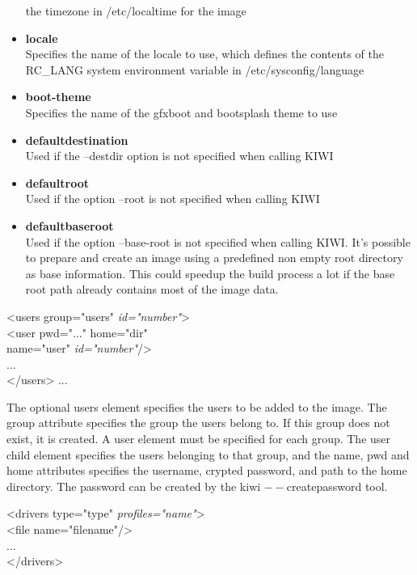 \begin{itemize}
      the timezone in /etc/localtime for the image
\item \textbf{locale}\\
      Specifies the name of the locale to use, which defines the
      contents of the RC\_LANG system environment variable in
      /etc/sysconfig/language
\item \textbf{boot-theme}\\
      Specifies the name of the gfxboot and bootsplash theme to use
\item \textbf{defaultdestination}\\
      Used if the --destdir option is not specified when calling KIWI
\item \textbf{defaultroot}\\
      Used if the option --root is not specified when calling KIWI
\item \textbf{defaultbaseroot}\\
      Used if the option --base-root is not specified when
      calling KIWI. It's possible to prepare and create an image using a
      predefined non empty root directory as base information.
      This could speedup the build process a lot if the base root path
      already contains most of the image data.
\end{itemize}

\begin{Command}{12cm}
<users group="users" \textit{id="number"}>\\
\hspace*{1cm}<user pwd="..." home="dir"\\ 
\hspace*{1.5cm}name="user" \textit{id="number"}/>\\
\hspace*{1cm}...\\
</users>
...
\end{Command}

The optional users element specifies the users to be added to the image.
The group attribute specifies the group the users belong to. If this group
does not exist, it is created. A user element must be specified for
each group. The user child element specifies the users belonging to that
group, and the name, pwd and home attributes specifies the username,
crypted password, and path to the home directory. The password can be
created by the kiwi $--$createpassword tool.

\begin{Command}{12cm}
<drivers type="type" \textit{profiles="name"}>\\
\hspace*{1cm}<file name="filename"/>\\
\hspace*{1cm}...\\
</drivers>
\end{Command}

